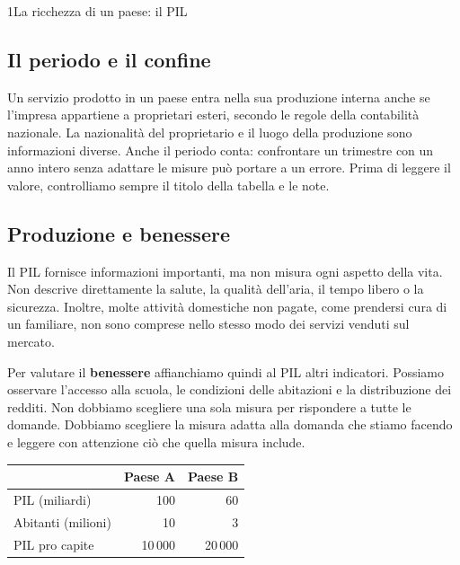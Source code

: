 \begin{lettura}{1}{La ricchezza di un paese: il PIL}
\subsection*{Il periodo e il confine}
Un servizio prodotto in un paese entra nella sua produzione interna anche se l'impresa appartiene a proprietari esteri, secondo le regole della contabilità nazionale. La nazionalità del proprietario e il luogo della produzione sono informazioni diverse. Anche il periodo conta: confrontare un trimestre con un anno intero senza adattare le misure può portare a un errore. Prima di leggere il valore, controlliamo sempre il titolo della tabella e le note.

\subsection*{Produzione e benessere}
Il PIL fornisce informazioni importanti, ma non misura ogni aspetto della vita. Non descrive direttamente la salute, la qualità dell'aria, il tempo libero o la sicurezza. Inoltre, molte attività domestiche non pagate, come prendersi cura di un familiare, non sono comprese nello stesso modo dei servizi venduti sul mercato.

Per valutare il \textbf{benessere} affianchiamo quindi al PIL altri indicatori. Possiamo osservare l'accesso alla scuola, le condizioni delle abitazioni e la distribuzione dei redditi. Non dobbiamo scegliere una sola misura per rispondere a tutte le domande. Dobbiamo scegliere la misura adatta alla domanda che stiamo facendo e leggere con attenzione ciò che quella misura include.



\begin{center}\begin{minipage}{\linewidth}\centering\small
\begin{tabular}{lrr}\toprule
 & Paese A & Paese B\\\midrule
PIL (miliardi) & 100 & 60\\
Abitanti (milioni) & 10 & 3\\
PIL pro capite & 10\,000 & 20\,000\\\bottomrule
\end{tabular}
\end{minipage}\end{center}


\attivita
\begin{enumerate}


\end{enumerate}
\end{lettura}
